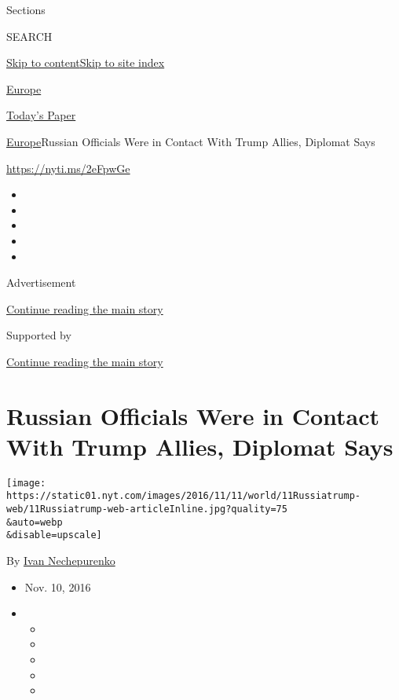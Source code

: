 Sections

SEARCH

\protect\hyperlink{site-content}{Skip to
content}\protect\hyperlink{site-index}{Skip to site index}

\href{https://www.nytimes.com/section/world/europe}{Europe}

\href{https://myaccount.nytimes.com/auth/login?response_type=cookie\&client_id=vi}{}

\href{https://www.nytimes.com/section/todayspaper}{Today's Paper}

\href{/section/world/europe}{Europe}\textbar{}Russian Officials Were in
Contact With Trump Allies, Diplomat Says

\url{https://nyti.ms/2eFpwGe}

\begin{itemize}
\item
\item
\item
\item
\item
\end{itemize}

Advertisement

\protect\hyperlink{after-top}{Continue reading the main story}

Supported by

\protect\hyperlink{after-sponsor}{Continue reading the main story}

\hypertarget{russian-officials-were-in-contact-with-trump-allies-diplomat-says}{%
\section{Russian Officials Were in Contact With Trump Allies, Diplomat
Says}\label{russian-officials-were-in-contact-with-trump-allies-diplomat-says}}

\texttt{[image: https://static01.nyt.com/images/2016/11/11/world/11Russiatrump-web/11Russiatrump-web-articleInline.jpg?quality=75\\\&auto=webp\\\&disable=upscale]}

By \href{https://www.nytimes.com/by/ivan-nechepurenko}{Ivan
Nechepurenko}

\begin{itemize}
\item
  Nov. 10, 2016
\item
  \begin{itemize}
  \item
  \item
  \item
  \item
  \item
  \end{itemize}
\end{itemize}

